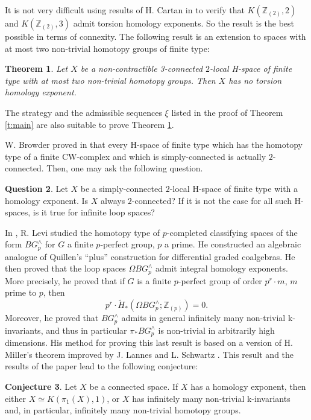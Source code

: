 \documentclass{amsart}
\newtheorem{thm}{Theorem}[section]
\theoremstyle{definition}
\newtheorem{conj}[thm]{Conjecture}
\newtheorem{quest}[thm]{Question}
\theoremstyle{remark}
\newcommand{\Z}{\mathbb{Z}}
\begin{document}
It is not very difficult using results of H. Cartan in \cite{Ca55} to verify that $K(\Z_{(2)},2)$ and $K(\Z_{(2)},3)$ admit torsion homology exponents. So the result is the best possible in terms of connexity. The following result is an extension to spaces with at most two non-trivial homotopy groups of finite type:

\begin{thm}\label{t:main2}
Let $X$ be a non-contractible 3-connected $2$-local H-space of finite type with at most two non-trivial homotopy groups. Then $X$ has no torsion homology exponent.
\end{thm}

The strategy and the admissible sequences $\xi$ listed in the proof of Theorem \ref{t:main} are also suitable to prove Theorem \ref{t:main2}.

\bigskip
W. Browder proved in \cite[Theorem 6.11, p. 46]{Br61} that every H-space of finite type which has the homotopy type of a finite CW-complex and which is simply-connected is actually $2$-connected. Then, one may ask the following question.

\begin{quest}
Let $X$ be a simply-connected $2$-local H-space of finite type with a homology exponent. Is $X$ always $2$-connected? If it is not the case for all such H-spaces, is it true for infinite loop spaces?
\end{quest}

\bigskip
In \cite{Le95}, R. Levi studied the homotopy type of $p$-completed classifying spaces of the form $BG^\wedge_p$ for $G$ a finite $p$-perfect group, $p$ a prime. He constructed an algebraic analogue of Quillen's ``plus'' construction for differential graded coalgebras. He then proved that the loop spaces $\Omega BG^\wedge_p$ admit integral homology exponents. More precisely, he proved that if $G$ is a finite $p$-perfect group of order $p^r\cdot m$, $m$ prime to $p$, then
$$
p^r\cdot\widetilde{H}_*(\Omega BG^\wedge_p;\Z_{(p)})=0.
$$
Moreover, he proved that $BG^\wedge_p$ admits in general infinitely many non-trivial k-invariants, and thus in particular $\pi_*BG^\wedge_p$ is non-trivial in arbitrarily high dimensions. His method for proving this last result is based on a version of H. Miller's theorem improved by J. Lannes and L. Schwartz \cite{LS86}. This result and the results of the paper lead to the following conjecture:

\begin{conj}\label{conj:conj}
Let $X$ be a connected space. If $X$ has a homology exponent, then either $X\simeq K(\pi_1(X),1)$, or $X$ has infinitely many non-trivial k-invariants and, in particular, infinitely many non-trivial homotopy groups. 
\end{conj}
\end{document}
